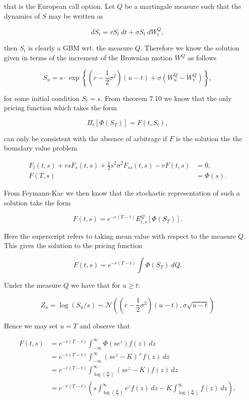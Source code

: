 \documentclass[
]{article}
\begin{document}
that is the European call option. Let \(Q\) be a martingale measure such
that the dynamics of \(S\) may be written as

\[
dS_t=r S_t\ dt+\sigma S_t\ dW^Q_t,
\]

then \(S_t\) is clearly a GBM wrt. the measure \(Q\). Therefore we know
the solution given in terms of the increment of the Brownian motion
\(W^Q\) as follows

\[
S_u=s\cdot \exp\left\{\left(r-\frac{1}{2}\sigma^2\right)(u-t)+\sigma\left(W_u^Q-W_t^Q\right)\right\},
\]

for some initial condition \(S_t=s\). From theorem 7.10 we know that the
only pricing function which takes the form

\[
\Pi_t[\Phi(S_T)]=F(t,S_t),
\]

can only be consistent with the absence of arbitrage if \(F\) is the
solution the the boundary value problem

\begin{align*}
F_t(t,s)+rsF_s(t,s)+\frac{1}{2}s^2\sigma^2F_{ss}(t,s)-rF(t,s)&=0,\\
F(T,s)&=\Phi(s).
\end{align*}

From Feymann-Kac we then know that the stochastic representation of such
a solution take the form

\[
F(t,s)=e^{-r(T-t)}E_{t,s}^Q[\Phi(S_T)].
\]

Here the superscript refers to taking mean value with respect to the
measure \(Q\). This gives the solution to the pricing function

\[
F(t,s)=e^{-r(T-t)}\int \Phi(S_T)\ dQ.
\]

Under the measure \(Q\) we have that for \(u\ge t\):

\[
Z_u=\log (S_u/s)\sim \mathcal{N}\left(\left(r-\frac{1}{2}\sigma^2\right)(u-t),\sigma\sqrt{u-t}\right)
\]

Hence we may set \(u=T\) and observe that

\begin{align*}
F(t,s)&=e^{-r(T-t)}\int_{-\infty}^\infty \Phi(se^z) f(z)\ dz\\
&=e^{-r(T-t)}\int_{-\infty}^\infty (se^z-K)^+ f(z)\ dz\\
&=e^{-r(T-t)}\int_{\log\left(\frac{K}{s}\right)}^{\infty} (se^z-K) f(z)\ dz\\
&=e^{-r(T-t)}\left(s\int_{\log\left(\frac{K}{s}\right)}^{\infty} e^z f(z)\ dz-K\int_{\log\left(\frac{K}{s}\right)}^{\infty} f(z)\ dz\right),
\end{align*}
\end{document}
